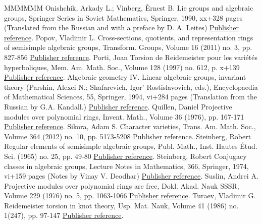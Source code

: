 \begin{thebibliography}{MMMMMM}
 Onishchik, Arkady L.; Vinberg, Èrnest B. Lie groups and algebraic groups, Springer Series in Soviet Mathematics, Springer, 1990, xx+328 pages (Translated from the Russian and with a preface by D. A. Leites) \href{https://ahl.centre-mersenne.org/item/AHL_2020__3__341_0/#OV}{Publisher reference}.
 Popov, Vladimir L. Cross-sections, quotients, and representation rings of semisimple algebraic groups, Transform. Groups, Volume 16 (2011) no. 3, pp. 827-856 \href{https://ahl.centre-mersenne.org/item/AHL_2020__3__341_0/#Popov}{Publisher reference}.
 Porti, Joan Torsion de Reidemeister pour les variétés hyperboliques, Mem. Am. Math. Soc., Volume 128 (1997) no. 612, p. x+139 \href{https://ahl.centre-mersenne.org/item/AHL_2020__3__341_0/#Porti}{Publisher reference}.
 Algebraic geometry IV. Linear algebraic groups, invariant theory (Parshin, Alexei N.; Shafarevich, Igor’ Rostislavovich, eds.), Encyclopaedia of Mathematical Sciences, 55, Springer, 1994, vi+284 pages (Translation from the Russian by G.A. Kandall.) \href{https://ahl.centre-mersenne.org/item/AHL_2020__3__341_0/#AlgebraicGeometryIV}{Publisher reference}.
 Quillen, Daniel Projective modules over polynomial rings, Invent. Math., Volume 36 (1976), pp. 167-171 \href{https://ahl.centre-mersenne.org/item/AHL_2020__3__341_0/#Quillen}{Publisher reference}.
 Sikora, Adam S. Character varieties, Trans. Am. Math. Soc., Volume 364 (2012) no. 10, pp. 5173-5208 \href{https://ahl.centre-mersenne.org/item/AHL_2020__3__341_0/#Sikora12}{Publisher reference}.
 Steinberg, Robert Regular elements of semisimple algebraic groups, Publ. Math., Inst. Hautes Étud. Sci. (1965) no. 25, pp. 49-80 \href{https://ahl.centre-mersenne.org/item/AHL_2020__3__341_0/#SteinbergIHES}{Publisher reference}.
 Steinberg, Robert Conjugacy classes in algebraic groups, Lecture Notes in Mathematics, 366, Springer, 1974, vi+159 pages (Notes by Vinay V. Deodhar) \href{https://ahl.centre-mersenne.org/item/AHL_2020__3__341_0/#Steinberg}{Publisher reference}.
 Suslin, Andrei A. Projective modules over polynomial rings are free, Dokl. Akad. Nauk SSSR, Volume 229 (1976) no. 5, pp. 1063-1066 \href{https://ahl.centre-mersenne.org/item/AHL_2020__3__341_0/#Suslin}{Publisher reference}.
 Turaev, Vladimir G. Reidemeister torsion in knot theory, Usp. Mat. Nauk, Volume 41 (1986) no. 1(247), pp. 97-147 \href{https://ahl.centre-mersenne.org/item/AHL_2020__3__341_0/#TuraevKnotTheory}{Publisher reference}.

\end{thebibliography}

